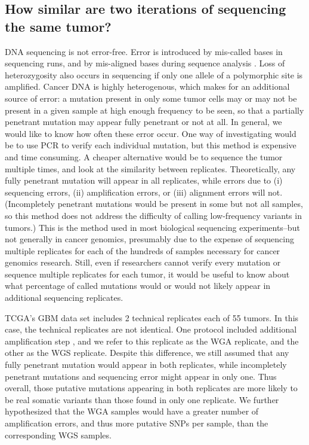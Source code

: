 \documentclass[11pt]{article} %
\begin{document}
\subsection*{How similar are two iterations of sequencing the same tumor?}


DNA sequencing is not error-free. Error is introduced by mis-called bases in sequencing runs, and by mis-aligned bases during sequence analysis \citep{seqerror}. Loss of heterozygosity also occurs in sequencing if only one allele of a polymorphic site is amplified. Cancer DNA is highly heterogenous, which makes for an additional source of error: a mutation present in only some tumor cells may or may not be present in a given sample at high enough frequency to be seen, so that a partially penetrant mutation may appear fully penetrant or not at all. In general, we would like to know how often these error occur. One way of investigating would be to use PCR to verify each individual mutation, but this method is expensive and time consuming. A cheaper alternative would be to sequence the tumor multiple times, and look at the similarity between replicates. Theoretically, any fully penetrant mutation will appear in all replicates, while errors due to (i) sequencing errors, (ii) amplification errors, or (iii) alignment errors will not. (Incompletely penetrant mutations would be present in some but not all samples, so this method does not address the difficulty of calling low-frequency variants in tumors.) This is the method used in most biological sequencing experiments--but not generally in cancer genomics, presumably due to the expense of sequencing multiple replicates for each of the hundreds of samples necessary for cancer genomics research. Still, even if researchers cannot verify every mutation or sequence multiple replicates for each tumor, it would be useful to know about what percentage of called mutations would or would not likely appear in additional sequencing replicates.

TCGA's GBM data set includes 2 technical replicates each of 55 tumors. In this case, the technical replicates are not identical. One protocol included additional amplification step \citep{TCGA-GBM}, and we refer to this replicate as the WGA replicate, and the other as the WGS replicate. Despite this difference, we still assumed that any fully penetrant mutation would appear in both replicates, while incompletely penetrant mutations and sequencing error might appear in only one. Thus overall, those putative mutations appearing in both replicates are more likely to be real somatic variants than those found in only one replicate. We further hypothesized that the WGA samples would have a greater number of amplification errors, and thus more putative SNPs per sample, than the corresponding WGS samples. 
\end{document}
